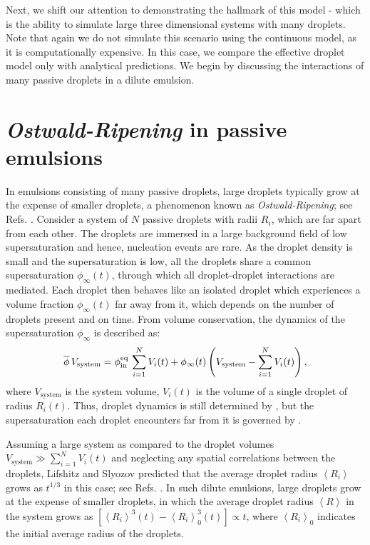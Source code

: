 Next, we shift our attention to demonstrating the hallmark of this model - which is the ability to simulate large three dimensional systems with many droplets.
Note that again we do not simulate this scenario using the continuous model, as it is computationally expensive.
In this case, we compare the effective droplet model only with analytical predictions. 
We begin by discussing the interactions of many passive droplets in a dilute emulsion.

\section{\textit{Ostwald-Ripening} in passive emulsions}

In emulsions consisting of many passive droplets, large droplets typically grow at the expense of smaller droplets, a phenomenon known as \textit{Ostwald-Ripening}; see Refs. \cite{Review2019,LSWanalytics}.
Consider a system of $N$ passive droplets with radii $R_i$, which are far apart from each other. 
The droplets are immersed in a large background field of low supersaturation and hence, nucleation events are rare.
As the droplet density is small and the supersaturation is low, all the droplets share a common supersaturation $\phi_\infty (t)$, through which all droplet-droplet interactions are mediated.
Each droplet then behaves like an isolated droplet which experiences a volume fraction $\phi_\infty(t)$ far away from it, which depends on the number of droplets present and on time.
From volume conservation, the dynamics of the supersaturation $\phi_\infty$ is described as:
\begin{equation}
\label{eqn:LSW_theory}
    \overline{\phi}\,V_\mathrm{system} = \phi^\mathrm{eq}_\mathrm{in} \, \sum_{i=1}^{N} V_i(t) + \phi_\infty(t) \left ( V_\mathrm{system} - \sum_{i=1}^{N} V_i(t) \right ),
\end{equation}
where $V_\mathrm{system}$ is the system volume, $V_i(t)$ is the volume of a single droplet of radius $R_i(t)$.
Thus, droplet dynamics is still determined by , but the supersaturation each droplet encounters far from it is governed by .

Assuming a large system as compared to the droplet volumes $V_\mathrm{system} \gg \sum_{i=1}^{N} V_i(t)$ and neglecting any spatial correlations between the droplets, Lifshitz and Slyozov predicted that the average droplet radius $\left \langle R_i \right \rangle$ grows as $t^{1/3}$ in this case; see Refs. \cite{Lifshitz,Wagner,LSWanalytics}.
In such dilute emulsions, large droplets grow at the expense of smaller droplets, in which the average droplet radius $\left \langle R \right \rangle$ in the system grows as $\left [ {\left \langle R_i \right \rangle} ^{3}(t) - {\left \langle R_i \right \rangle}_0^{3}(t) \right ] \propto t$, where ${\left \langle R_i \right \rangle}_0$ indicates the initial average radius of the droplets.

